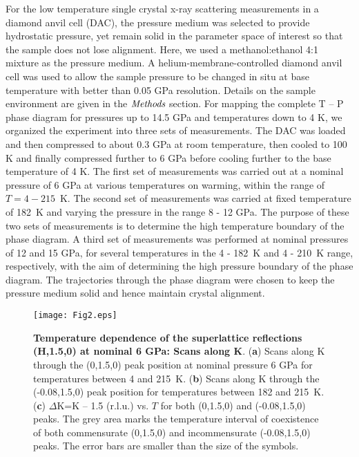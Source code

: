 \documentclass[preprint,superscriptaddress,amsmath,amssymb,aps,prl]{revtex4-1}
\begin{document}
For the low temperature single crystal x-ray scattering measurements in a diamond anvil cell (DAC), the pressure medium was selected to provide hydrostatic pressure, yet remain solid in the parameter space of interest so that the sample does not lose alignment. Here, we used a methanol:ethanol 4:1 mixture as the pressure medium. A helium-membrane-controlled diamond anvil cell was used to allow the sample pressure to be changed in situ at base temperature with better than 0.05 GPa resolution. Details on the sample environment are given in the $\emph{Methods}$ section. For mapping the complete T -- P phase diagram for pressures up to 14.5 GPa and temperatures down to 4 K, we organized the experiment into three sets of measurements. The DAC was loaded and then compressed to about 0.3 GPa at room temperature, then cooled to 100 K and finally compressed further to 6 GPa before cooling further to the base temperature of 4 K. The first set of measurements was carried out at a nominal pressure of 6 GPa at various temperatures on warming, within the range of $T=4 - 215$~K. The second set of measurements was carried at fixed temperature of 182~K and varying the pressure in the range 8 - 12 GPa. The purpose of these two sets of measurements is to determine the high temperature boundary of the phase diagram. A third set of measurements was performed at nominal pressures of 12 and 15 GPa, for several temperatures in the 4 - 182~K and 4 - 210~K range, respectively, with the aim of determining the high pressure boundary of the phase diagram. The trajectories through the phase diagram were chosen to keep the pressure medium solid and hence maintain crystal alignment.

\begin{center}
\begin{figure}
\begin{center}
\texttt{[image: Fig2.eps]}
\caption{\textbf{Temperature dependence of the superlattice reflections (H,1.5,0) at nominal 6 GPa: Scans along K}. (\textbf{a}) Scans along K through the (0,1.5,0) peak position at nominal pressure 6 GPa for temperatures between 4 and 215~K. (\textbf{b}) Scans along K through the (-0.08,1.5,0) peak position for temperatures between 182 and 215~K. (\textbf{c}) $\Delta$K=K -- 1.5 (r.l.u.) vs. $T$ for both (0,1.5,0) and (-0.08,1.5,0) peaks. The grey area marks the temperature interval of coexistence of both commensurate (0,1.5,0) and incommensurate (-0.08,1.5,0) peaks. The error bars are smaller than the size of the symbols.}
\label{fig:Fig2}
\end{center}
\end{figure}
\end{center}
\end{document}
